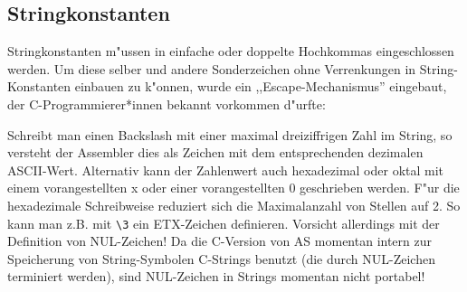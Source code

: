 \documentclass[12pt,a4paper,twoside]{report}
\begin{document}
\subsection{Stringkonstanten}
\label{SectStringConsts}

Stringkonstanten m"ussen in einfache oder doppelte Hochkommas
eingeschlossen werden.  Um diese selber und andere Sonderzeichen ohne
Verrenkungen in String-Konstanten einbauen zu k"onnen, wurde ein
,,Escape-Mechanismus'' eingebaut, der C-Programmierer*innen bekannt
vorkommen d"urfte:

Schreibt man einen Backslash mit einer maximal dreiziffrigen Zahl im
String, so versteht der Assembler dies als Zeichen mit dem entsprechenden
dezimalen ASCII-Wert.  Alternativ kann der Zahlenwert auch hexadezimal
oder oktal mit einem vorangestellten x oder einer vorangestellten 0
geschrieben werden.  F"ur die hexadezimale Schreibweise reduziert sich die
Maximalanzahl von Stellen auf 2.  So kann man z.B. mit {\tt\verb!\3!} ein
ETX-Zeichen definieren.  Vorsicht allerdings mit der Definition von
NUL-Zeichen!  Da die C-Version  von AS momentan
intern zur Speicherung von String-Symbolen C-Strings benutzt (die durch
NUL-Zeichen terminiert werden), sind NUL-Zeichen in Strings momentan nicht
portabel!
\end{document}
